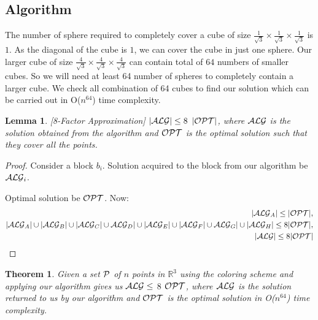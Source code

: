 \documentclass[a4paper,10pt]{article}  %
\newtheorem{theorem}{Theorem}
\newtheorem{lemma}{Lemma}
\begin{document}
	\subsection{Algorithm}
	
	The number of sphere required to completely cover a cube of size $\frac{1}{\sqrt{3}} \times \frac{1}{\sqrt{3}} \times \frac{1}{\sqrt{3}}$ is $1$. As the diagonal of the cube is $1$, we can cover the cube in just one sphere. Our larger cube of size
	 $\frac{4}{\sqrt{3}} \times \frac{4}{\sqrt{3}} \times \frac{4}{\sqrt{3}}$ can contain total of $64$ numbers of smaller cubes. So we will need at least 64 number of spheres to completely contain a larger cube. We check all combination of 64 cubes to find our solution which can be carried out in O($n^{64}$) time complexity. 
	 
	 \begin{lemma}\label{cube}[8-Factor Approximation]
	 	$|{\cal ALG}| \leq 8$ $|{\cal OPT}|$, where ${\cal ALG}$ is the solution obtained from the algorithm and ${\cal OPT}$ is the optimal solution such that they cover all the points.
	 \end{lemma}
	 \begin{proof}
	 	Consider a block $b_i$. Solution acquired to the block from our algorithm be ${\cal ALG}_i$.
	 	
	 	Optimal solution be ${\cal OPT}$. Now: \\
	 	\begin{align*} 
	 	|{\cal ALG}_A|\leq |{\cal OPT}|,\\ 
	 	|{\cal ALG}_A|\cup|{\cal ALG}_B|\cup|{\cal ALG}_C| \cup {\cal ALG}_D|\cup|{\cal ALG}_E|\cup|{\cal ALG}_F|\cup{\cal ALG}_G|\cup|{\cal ALG}_H|\leq 8|{\cal OPT}|,\\
	 	|{\cal ALG}|\leq 8|{\cal OPT}|
	 	\end{align*}%
	 \end{proof}
	 \theoremstyle{theorem}
	 \begin{theorem}
	 	Given a set ${\cal P}$ of $n$ points in $\mathbb{R}^3$ using the coloring scheme and applying our algorithm gives us $\cal{ALG} \leq$ $8$  $\cal{OPT}$, where $\cal {ALG}$ is the solution returned to us by our algorithm and $\cal{OPT}$ is the optimal solution in O($n^{64}$) time complexity. 
	 \end{theorem}
	 
		
\end{document}
